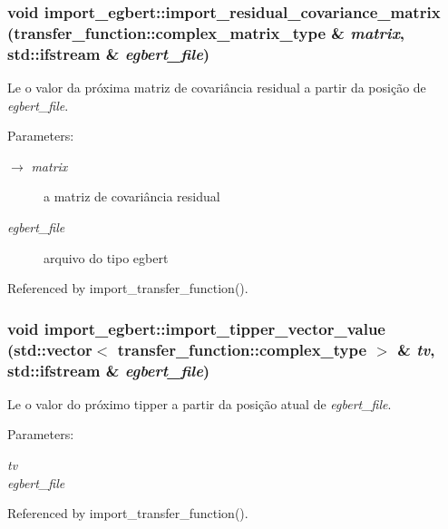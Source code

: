 \subsubsection{\setlength{\rightskip}{0pt plus 5cm}void import\_\-egbert::import\_\-residual\_\-covariance\_\-matrix (transfer\_\-function::complex\_\-matrix\_\-type \& {\em matrix}, \/  std::ifstream \& {\em egbert\_\-file})}\label{namespaceimport__egbert_bcb91ba4086f3d5f6b4fc6eee3b42a37}


Le o valor da próxima matriz de covariância residual a partir da posição de {\em egbert\_\-file\/}. 

\begin{Desc}
\item[Parameters:]
\begin{description}
\item[\mbox{$\rightarrow$} {\em matrix}]a matriz de covariância residual \item[{\em egbert\_\-file}]arquivo do tipo egbert \end{description}
\end{Desc}


Referenced by import\_\-transfer\_\-function().
\subsubsection{\setlength{\rightskip}{0pt plus 5cm}void import\_\-egbert::import\_\-tipper\_\-vector\_\-value (std::vector$<$ transfer\_\-function::complex\_\-type $>$ \& {\em tv}, \/  std::ifstream \& {\em egbert\_\-file})}\label{namespaceimport__egbert_e99e8243f942eeb0165b4293a7bb7c2a}


Le o valor do próximo tipper a partir da posição atual de {\em egbert\_\-file\/}. 

\begin{Desc}
\item[Parameters:]
\begin{description}
\item[{\em tv}]\item[{\em egbert\_\-file}]\end{description}
\end{Desc}


Referenced by import\_\-transfer\_\-function().
